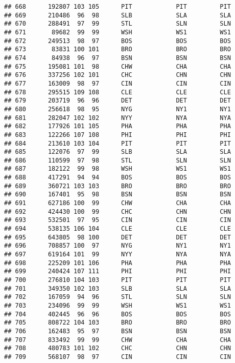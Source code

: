 \documentclass[]{article}
\begin{document}
\begin{verbatim}
## 668      192807 103 105      PIT            PIT         PIT
## 669      210486  96  98      SLB            SLA         SLA
## 670      288491  97  99      STL            SLN         SLN
## 671       89682  99  99      WSH            WS1         WS1
## 672      249513  98  97      BOS            BOS         BOS
## 673       83831 100 101      BRO            BRO         BRO
## 674       84938  96  97      BSN            BSN         BSN
## 675      195081 101  98      CHW            CHA         CHA
## 676      337256 102 101      CHC            CHN         CHN
## 677      163009  98  97      CIN            CIN         CIN
## 678      295515 109 108      CLE            CLE         CLE
## 679      203719  96  96      DET            DET         DET
## 680      256618  98  95      NYG            NY1         NY1
## 681      282047 102 102      NYY            NYA         NYA
## 682      177926 101 105      PHA            PHA         PHA
## 683      122266 107 108      PHI            PHI         PHI
## 684      213610 103 104      PIT            PIT         PIT
## 685      122076  97  99      SLB            SLA         SLA
## 686      110599  97  98      STL            SLN         SLN
## 687      182122  99  98      WSH            WS1         WS1
## 688      417291  94  94      BOS            BOS         BOS
## 689      360721 103 103      BRO            BRO         BRO
## 690      167401  95  98      BSN            BSN         BSN
## 691      627186 100  99      CHW            CHA         CHA
## 692      424430 100  99      CHC            CHN         CHN
## 693      532501  97  95      CIN            CIN         CIN
## 694      538135 106 104      CLE            CLE         CLE
## 695      643805  98 100      DET            DET         DET
## 696      708857 100  97      NYG            NY1         NY1
## 697      619164 101  99      NYY            NYA         NYA
## 698      225209 101 106      PHA            PHA         PHA
## 699      240424 107 111      PHI            PHI         PHI
## 700      276810 104 103      PIT            PIT         PIT
## 701      349350 102 103      SLB            SLA         SLA
## 702      167059  94  96      STL            SLN         SLN
## 703      234096  99  99      WSH            WS1         WS1
## 704      402445  96  96      BOS            BOS         BOS
## 705      808722 104 103      BRO            BRO         BRO
## 706      162483  95  97      BSN            BSN         BSN
## 707      833492  99  99      CHW            CHA         CHA
## 708      480783 101 102      CHC            CHN         CHN
## 709      568107  98  97      CIN            CIN         CIN

\end{verbatim}
\end{document}
